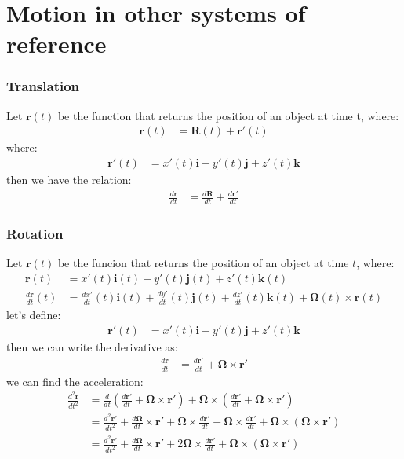 \documentclass{article}
\begin{document}
\section*{Motion in other systems of reference}
\subsubsection*{Translation}
Let $\bm{r}(t)$ be the function that returns the position of an object at time t, where:
\begin{align*}
    \bm{r}(t) &= \bm{R}(t) + \bm{r'}(t)
\end{align*}
where:
\begin{align*}
    \bm{r'}(t) &= x'(t)\bm{i} + y'(t)\bm{j} + z'(t)\bm{k}
\end{align*}
then we have the relation:
\begin{align*}
    \frac{d\bm{r}}{dt}
    &= \frac{d\bm{R}}{dt} + \frac{d\bm{r'}}{dt}
\end{align*}

\subsubsection*{Rotation}
Let $\bm{r}(t)$ be the funcion that returns the position of an object at time $t$, where:
\begin{align*}
    \bm{r}(t) 
    &= x'(t)\bm{i}(t) + y'(t)\bm{j}(t) + z'(t)\bm{k}(t) \\
    \frac{d\bm{r}}{dt}(t)
    &= \frac{dx'}{dt}(t)\bm{i}(t) + \frac{dy'}{dt}(t)\bm{j}(t) + \frac{dz'}{dt}(t)\bm{k}(t)
    + \bm{\Omega}(t) \times \bm{r}(t) 
\end{align*}
let's define:
\begin{align*}
    \bm{r'}(t) &= x'(t)\bm{i} + y'(t)\bm{j} + z'(t)\bm{k}
\end{align*}
then we can write the derivative as:
\begin{align*}
    \frac{d\bm{r}}{dt}
    &= \frac{d\bm{r'}}{dt} + \bm{\Omega} \times \bm{r'} 
\end{align*}
we can find the acceleration:
\begin{align*}
    \frac{d^2\bm{r}}{dt^2} 
    &=\frac{d}{dt} \left( \frac{d\bm{r'}}{dt} + \bm{\Omega} \times \bm{r'} \right) 
    + \bm{\Omega} \times \left(\frac{d\bm{r'}}{dt} + \bm{\Omega} \times \bm{r'} \right) \\
    &=\frac{d^2\bm{r'}}{dt^2} 
    + \frac{d \bm{\Omega}}{dt} \times \bm{r'} + \bm{\Omega} \times \frac{d\bm{r'}}{dt}
    + \bm{\Omega} \times \frac{d\bm{r'}}{dt} + \bm{\Omega} \times (\bm{\Omega} \times \bm{r'}) \\
    &=\frac{d^2\bm{r'}}{dt^2}
    + \frac{d\bm{\Omega}}{dt} \times \bm{r'}
    + 2\bm{\Omega} \times \frac{d\bm{r'}}{dt}
    + \bm{\Omega} \times (\bm{\Omega} \times \bm{r'}) \\
\end{align*}
\end{document}
